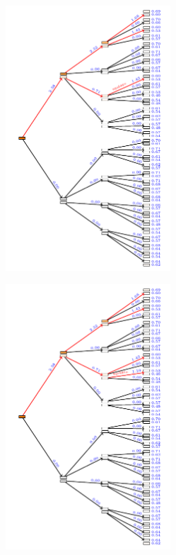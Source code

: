 \documentclass[aspectratio=169]{beamer}
\begin{document}
\begin{landscape}
    \begin{frame}
        \begin{figure}
            \includegraphics[width=0.55\textwidth]{trees/1/tex_tree_8.pdf}
        \end{figure}
    \end{frame}
\end{landscape}

\begin{landscape}
    \begin{frame}
        \begin{figure}
            \includegraphics[width=0.55\textwidth]{trees/1/tex_tree_9.pdf}
        \end{figure}
    \end{frame}
\end{landscape}
\end{document}
